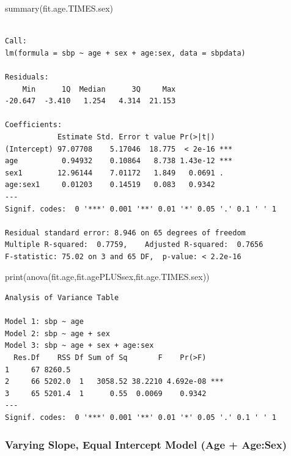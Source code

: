 \documentclass[
  letterpaper,
  DIV=11,
  numbers=noendperiod]{scrreprt}
\newenvironment{Shaded}{\begin{snugshade}}{\end{snugshade}}
\newcommand{\FunctionTok}[1]{\textcolor[rgb]{0.28,0.35,0.67}{#1}}
\newcommand{\NormalTok}[1]{\textcolor[rgb]{0.00,0.23,0.31}{#1}}
\begin{document}
\begin{Shaded}
\begin{Highlighting}[]
\FunctionTok{summary}\NormalTok{(fit.age.TIMES.sex)}
\end{Highlighting}
\end{Shaded}

\begin{verbatim}

Call:
lm(formula = sbp ~ age + sex + age:sex, data = sbpdata)

Residuals:
    Min      1Q  Median      3Q     Max 
-20.647  -3.410   1.254   4.314  21.153 

Coefficients:
            Estimate Std. Error t value Pr(>|t|)    
(Intercept) 97.07708    5.17046  18.775  < 2e-16 ***
age          0.94932    0.10864   8.738 1.43e-12 ***
sex1        12.96144    7.01172   1.849   0.0691 .  
age:sex1     0.01203    0.14519   0.083   0.9342    
---
Signif. codes:  0 '***' 0.001 '**' 0.01 '*' 0.05 '.' 0.1 ' ' 1

Residual standard error: 8.946 on 65 degrees of freedom
Multiple R-squared:  0.7759,    Adjusted R-squared:  0.7656 
F-statistic: 75.02 on 3 and 65 DF,  p-value: < 2.2e-16
\end{verbatim}

\begin{Shaded}
\begin{Highlighting}[]
\FunctionTok{print}\NormalTok{(}\FunctionTok{anova}\NormalTok{(fit.age,fit.agePLUSsex,fit.age.TIMES.sex))}
\end{Highlighting}
\end{Shaded}

\begin{verbatim}
Analysis of Variance Table

Model 1: sbp ~ age
Model 2: sbp ~ age + sex
Model 3: sbp ~ age + sex + age:sex
  Res.Df    RSS Df Sum of Sq       F    Pr(>F)    
1     67 8260.5                                   
2     66 5202.0  1   3058.52 38.2210 4.692e-08 ***
3     65 5201.4  1      0.55  0.0069    0.9342    
---
Signif. codes:  0 '***' 0.001 '**' 0.01 '*' 0.05 '.' 0.1 ' ' 1
\end{verbatim}

\subsubsection{Varying Slope, Equal Intercept Model (Age +
Age:Sex)}\label{varying-slope-equal-intercept-model-age-agesex}
\end{document}
